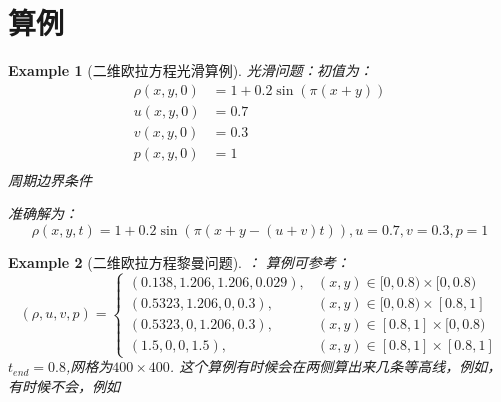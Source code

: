 \documentclass{article}
\newtheorem{example}{Example}
\numberwithin{equation}{section}    %
\begin{document}
\section{算例}
\begin{example}[二维欧拉方程光滑算例]{}{}
    光滑问题：初值为：
    \begin{equation}
        \begin{aligned}
            \rho(x,y,0) & = 1+0.2\sin(\pi(x+y)) \\
            u(x,y,0)    & = 0.7                 \\
            v(x,y,0)    & = 0.3                 \\
            p(x,y,0)    & = 1                   \\
        \end{aligned}
    \end{equation}
    周期边界条件

    准确解为：
    \begin{equation}
        \rho(x,y,t) = 1+0.2\sin(\pi(x+y-(u+v)t)),u=0.7,v=0.3,p=1
    \end{equation}
\end{example}
\begin{example}[二维欧拉方程黎曼问题]{}{}：
    算例可参考：\cite{RN114}
    \begin{equation}
        (\rho, u, v, p)=\begin{cases}
            (0.138,1.206,1.206,0.029), & (x, y) \in[0,0.8) \times[0,0.8) \\
            (0.5323,1.206,0,0.3),      & (x, y) \in[0,0.8) \times[0.8,1] \\
            (0.5323,0,1.206,0.3),      & (x, y) \in[0.8,1] \times[0,0.8) \\
            (1.5,0,0,1.5),             & (x, y) \in[0.8,1] \times[0.8,1]
        \end{cases}
    \end{equation}
    $t_{end}=0.8$,网格为$400\times400$. 这个算例有时候会在两侧算出来几条等高线，例如\cite{ha2013modified,ha2016sixth,ha2024new}，有时候不会，例如\cite{fleischmann2019numerical,liang2024new,jeong2022development}

\end{example}
\end{document}
